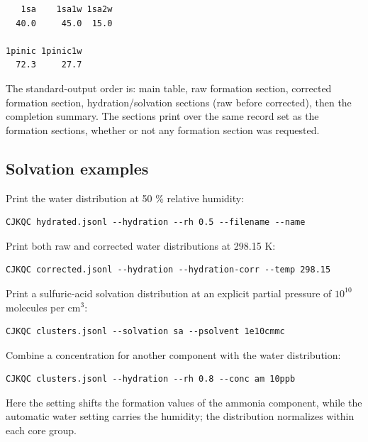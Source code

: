 \begin{verbatim}
   1sa    1sa1w 1sa2w
  40.0     45.0  15.0

1pinic 1pinic1w
  72.3     27.7
\end{verbatim}

The standard-output order is: main table, raw formation section, corrected
formation section, hydration/solvation sections (raw before corrected), then
the completion summary. The sections print over the same record set as the
formation sections, whether or not any formation section was requested.

\subsection{Solvation examples}\label{sec:solvation-example}

Print the water distribution at 50 \% relative humidity:

\begin{verbatim}
CJKQC hydrated.jsonl --hydration --rh 0.5 --filename --name
\end{verbatim}

Print both raw and corrected water distributions at 298.15 K:

\begin{verbatim}
CJKQC corrected.jsonl --hydration --hydration-corr --temp 298.15
\end{verbatim}

Print a sulfuric-acid solvation distribution at an explicit partial pressure
of $10^{10}$ molecules per cm$^3$:

\begin{verbatim}
CJKQC clusters.jsonl --solvation sa --psolvent 1e10cmmc
\end{verbatim}

Combine a concentration for another component with the water distribution:

\begin{verbatim}
CJKQC clusters.jsonl --hydration --rh 0.8 --conc am 10ppb
\end{verbatim}

Here the  setting shifts the formation values of the
ammonia component, while the automatic water setting carries the humidity; the
distribution normalizes within each core group.
